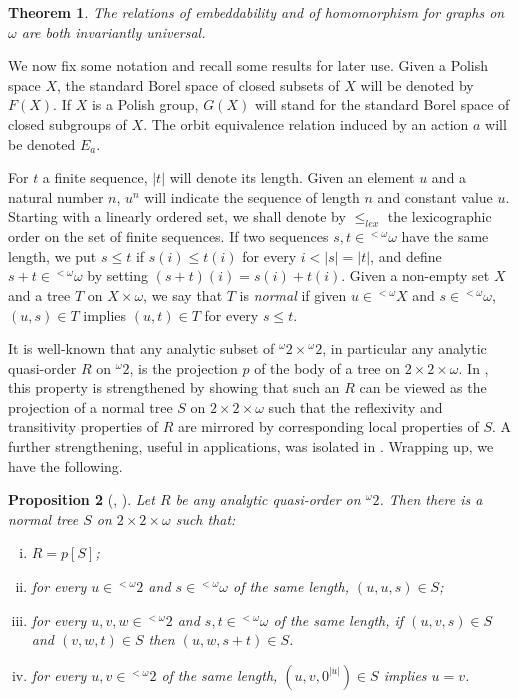 \documentclass{amsart}
\newtheorem{theorem}{Theorem}[section]
\newtheorem{proposition}[theorem]{Proposition}
\theoremstyle{definition}
\theoremstyle{remark}
\begin{document}
\begin{theorem}
The relations of embeddability and of
homomorphism for graphs on $\omega$ are both
invariantly universal.
\end{theorem}

\medskip
We now fix some notation and recall some results for later use.
Given a Polish space $X$, the standard Borel space of closed subsets
of $X$ will be denoted by $F(X)$.
If $X$ is a Polish group, $G(X)$ will stand for the standard Borel
space of closed subgroups of $X$.
The orbit equivalence relation induced by an action $a$ will be denoted $E_a$.

For $t$ a finite sequence, $|t|$ will denote its length.
Given an element $u$ and a natural number $n$, $u^n$ will indicate the
sequence of length $n$ and constant value $u$.
Starting with a linearly ordered set, we shall denote by $\leq_{lex}$ the lexicographic order on the set of finite sequences.
If two sequences $s,t \in {{}^{<\omega}\omega}$ have the
same length, we
put $s \leq t$ if $s(i) \leq t(i)$ for every $i < |s|=|t|$, and
define $s+t \in {{}^{<\omega}\omega}$ by setting $(s+t)(i) = s(i)+t(i)$. Given a
non-empty set $X$ and a tree
$T$ on $X \times \omega$, we say that $T$ is \emph{normal} if
given $u \in {}^{<\omega}X$ and $s \in {{}^{<\omega}\omega}$, $(u,s) \in T$ implies
$(u,t) \in T$ for every $s \leq t$.

It is well-known that any analytic
subset of ${}^\omega 2 \times {}^\omega 2$, in particular any
analytic quasi-order $R$ on ${}^\omega 2$, is the projection $p$ of the body of a tree
on $2 \times 2 \times \omega$.
In \cite[Theorem 2.4]{louros}, this property is strengthened by showing that such an $R$ can be
viewed as the
projection of a normal tree $S$ on $2 \times 2 \times \omega$ such
that the reflexivity and transitivity properties of $R$ are
mirrored by corresponding local properties of $S$. A further
strengthening, useful in applications, was isolated in \cite{FriMot}.
Wrapping up, we have the following.

\begin{proposition}[\cite{louros}, \cite{FriMot}]\label{propnormalform}
  Let $R$ be any analytic quasi-order on ${}^\omega 2$. Then there is a
  normal tree $S$ on $2 \times 2 \times \omega$ such that:
  \begin{enumerate}[i)]
  \item $R = p[S]$;
\item for every $u \in {}^{< \omega}2$ and $s \in {{}^{<\omega}\omega}$ of the same
  length, $(u,u,s) \in S$;
\item for every $u,v,w \in {}^{<\omega}2$ and $s,t \in {{}^{<\omega}\omega}$ of the
  same length, if $(u,v,s) \in S$ and $(v,w,t) \in S$ then $(u,w,s+t)
  \in S$.
 \item for every $u,v \in {}^{<\omega}2$ of the same
   length, $(u,v,0^{|u|}) \in S$ implies $u=v$.
\end{enumerate}
\end{proposition}
\end{document}
